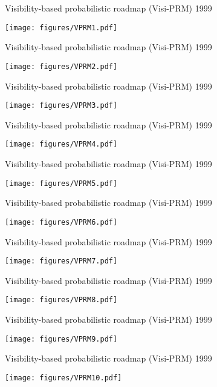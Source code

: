 %
%
\begin{frame} {Visibility-based probabilistic roadmap (Visi-PRM) 1999}
\centerline {
  \texttt{[image: figures/VPRM1.pdf]}
}
\end{frame}

\begin{frame} {Visibility-based probabilistic roadmap (Visi-PRM) 1999}
\centerline {
  \texttt{[image: figures/VPRM2.pdf]}
}
\end{frame}

\begin{frame} {Visibility-based probabilistic roadmap (Visi-PRM) 1999}
\centerline {
  \texttt{[image: figures/VPRM3.pdf]}
}
\end{frame}

\begin{frame} {Visibility-based probabilistic roadmap (Visi-PRM) 1999}
\centerline {
  \texttt{[image: figures/VPRM4.pdf]}
}
\end{frame}

\begin{frame} {Visibility-based probabilistic roadmap (Visi-PRM) 1999}
\centerline {
  \texttt{[image: figures/VPRM5.pdf]}
}
\end{frame}

\begin{frame} {Visibility-based probabilistic roadmap (Visi-PRM) 1999}
\centerline {
  \texttt{[image: figures/VPRM6.pdf]}
}
\end{frame}

\begin{frame} {Visibility-based probabilistic roadmap (Visi-PRM) 1999}
\centerline {
  \texttt{[image: figures/VPRM7.pdf]}
}
\end{frame}

\begin{frame} {Visibility-based probabilistic roadmap (Visi-PRM) 1999}
\centerline {
  \texttt{[image: figures/VPRM8.pdf]}
}
\end{frame}

\begin{frame} {Visibility-based probabilistic roadmap (Visi-PRM) 1999}
\centerline {
  \texttt{[image: figures/VPRM9.pdf]}
}
\end{frame}

\begin{frame} {Visibility-based probabilistic roadmap (Visi-PRM) 1999}
\centerline {
  \texttt{[image: figures/VPRM10.pdf]}
}
\end{frame}

